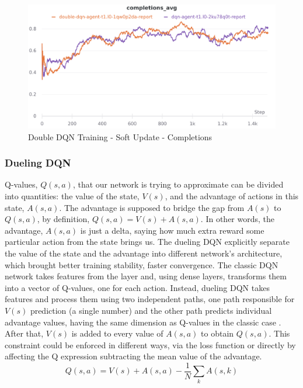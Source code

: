 \documentclass[12pt]{article}
\begin{document}
\begin{figure}[H]
        \centerline{\includegraphics[scale=.2]{res/charts/double_completions.png}}
        \caption{Double DQN Training - Soft Update - Completions}
\end{figure}

\subsubsection{Dueling DQN}
Q-values, $Q(s,a)$, that our network is trying to approximate can be divided into quantities: the value of the state, $V(s)$, and the advantage of actions in this state, $A(s,a)$. The advantage is supposed to bridge the gap from $A(s)$ to $Q(s,a)$, by definition, $Q(s,a)=V(s) + A(s,a)$. In other words, the advantage, $A(s,a)$ is just a delta, saying how much extra reward some particular action from the state brings us. The dueling DQN explicitly separate the value of the state and the advantage into different network's architecture, which brought better training stability, faster convergence. The classic DQN network takes features from the layer and, using dense layers, transforms them into a vector of Q-values, one for each action. Instead, dueling DQN takes features and process them using two independent paths, one path responsible for $V(s)$ prediction (a single number) and the other path predicts individual advantage values, having the same dimension as Q-values in the classic case \cite{dueling-dqn}. After that, $V(s)$ is added to every value of $A(s,a)$ to obtain $Q(s,a)$. 
This constraint could be enforced in different ways, via the loss function or directly by affecting the Q expression subtracting the mean value of the advantage.
\[ Q(s,a)= V(s) + A(s,a) - \frac{1}{N} \sum_k A(s,k) \]
\end{document}
